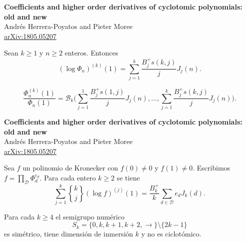 \documentclass[10pt,compress]{beamer}
\newcommand{\stirlingtwo}[2]{\genfrac{\{}{\}}{0pt}{}{#1}{#2}}
\begin{document}
\begin{frame}
  \begin{tcolorbox}[colback=ChetwodeBlue!10,colframe=ChetwodeBlue!60]
    \begin{center}
      \vspace*{-1mm} {
        \color{TurkishRose}\textbf{Coefficients and higher order derivatives of cyclotomic polynomials: old and new}} \\
      Andr\'es Herrera-Poyatos and Pieter Moree \\
      \href{https://arxiv.org/abs/1805.05207}{arXiv:1805.05207}
    \end{center}
    \vspace*{-4mm}
  \end{tcolorbox}

  \begin{theorem}[Lehmer, 1966]
    Sean $k \ge 1$ y $n\ge 2$ enteros. Entonces
    \[(\log \Phi_n)^{(k)}(1) = \sum_{j=1}^{k} \frac{B_j^+ s(k,j)}{j} J_j(n).\]
  \end{theorem}

  \begin{theorem} 
    \[\frac{\Phi_n^{(k)}(1)}{\Phi_n(1)}= \mathcal{B}_k\Big(\sum_{j=1}^{1} \frac{B_j^+ s(1,j)}{j}
      J_j(n), \dots, \sum_{j=1}^{k} \frac{B_j^+ s(k,j)}{j} J_j(n)\Big).\]
  \end{theorem}
\end{frame}

\begin{frame}
  \begin{tcolorbox}[colback=ChetwodeBlue!10,colframe=ChetwodeBlue!60]
    \begin{center}
      \vspace*{-1mm} {
        \color{TurkishRose}\textbf{Coefficients and higher order derivatives of cyclotomic polynomials: old and new}} \\
      Andr\'es Herrera-Poyatos and Pieter Moree \\
      \href{https://arxiv.org/abs/1805.05207}{arXiv:1805.05207}
    \end{center}
    \vspace*{-4mm}
  \end{tcolorbox}

  \begin{theorem} 
   Sea $f$ un polinomio de Kronecker con $f(0) \ne 0$ y $f(1) \ne 0$. Escribimos $f = \prod_{\mathcal{D}} \Phi_d^{e_d}$. Para cada entero
    $k\ge 2$ se tiene
    \[ \sum_{j = 1}^k \stirlingtwo{k}{j} (\log f)^{(j)}(1) = \frac{B_{k}^+}{k} \sum_{d \in
        \mathcal{D}} e_d J_k(d). \] \vspace*{-4mm}
  \end{theorem}

  \begin{theorem} 
    Para cada $k \ge 4$ el semigrupo numérico
    \[S_k = \{0, k, k+1, k+2, \rightarrow\} \setminus \{2k-1\}\]
    es simétrico, tiene dimensión de inmersión $k$ y no es ciclotómico.    
  \end{theorem}
\end{frame}
\end{document}
